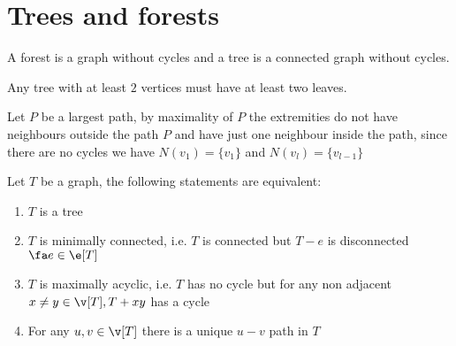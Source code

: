 \chapter{Trees and forests}
A forest is a graph without cycles and a tree is a connected graph without cycles.
\begin{customlemma}{1.14}
    \label{lemma:1.14}
    Any tree with at least $2$ vertices must have at least two leaves.
\end{customlemma}
\begin{prf}
    Let $P$ be a largest path, by maximality of $P$ the extremities do not have neighbours outside the path $P$ and have just one neighbour inside the path, since there are no cycles we have $N(v_1) = \{v_1\}$ and $N(v_l) = \{v_{l - 1}\}$
\end{prf}
\begin{customtheorem}{1.15}
    \label{theorem:1.15}
    Let $T$ be a graph, the following statements are equivalent:
    \begin{enumerate}
        \item $T$ is a tree
        \item $T$ is minimally connected, i.e. $T$ is connected but $T - e$ is disconnected $\fa e \in \e[T]$
        \item $T$ is maximally acyclic, i.e. $T$ has no cycle but for any non adjacent $x \neq y \in \v[T], T + xy$ has a cycle
        \item For any $u, v \in \v[T]$ there is a unique $u - v$ path in $T$
    \end{enumerate}
\end{customtheorem}

